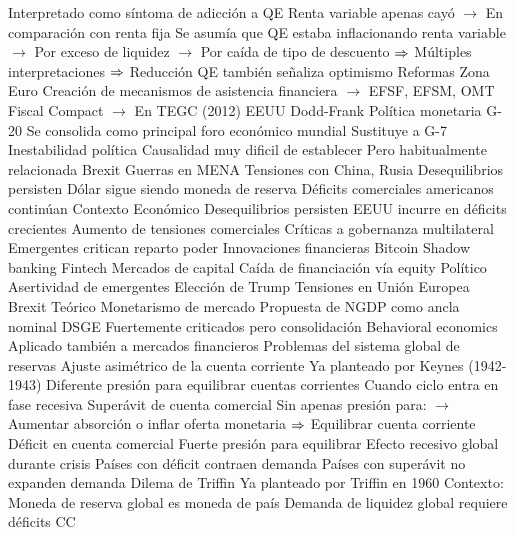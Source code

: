 \documentclass{nuevotema}
\begin{document}
\begin{esquemal}
				\4[] Interpretado como síntoma de adicción a QE
				\4[] Renta variable apenas cayó
				\4[] $\to$ En comparación con renta fija
				\4[] Se asumía que QE estaba inflacionando renta variable
				\4[] $\to$ Por exceso de liquidez
				\4[] $\to$ Por caída de tipo de descuento
				\4[] $\then$ Múltiples interpretaciones
				\4[] $\then$ Reducción QE también señaliza optimismo
			\3 Reformas
				\4 Zona Euro
				\4[] Creación de mecanismos de asistencia financiera
				\4[] $\to$ EFSF, EFSM, OMT
				\4[] Fiscal Compact
				\4[] $\to$ En TEGC (2012)
				\4 EEUU
				\4[] Dodd-Frank
				\4[] Política monetaria
				\4 G-20
				\4[] Se consolida como principal foro económico mundial
				\4[] Sustituye a G-7
			\3 Inestabilidad política
				\4 Causalidad muy dificil de establecer
				\4[] Pero habitualmente relacionada
				\4 Brexit
				\4 Guerras en MENA
				\4 Tensiones con China, Rusia
			\3 Desequilibrios persisten
				\4 Dólar sigue siendo moneda de reserva
				\4 Déficits comerciales americanos continúan
	\1 
		\2 Contexto
			\3 Económico
				\4 Desequilibrios persisten
				\4 EEUU incurre en déficits crecientes
				\4 Aumento de tensiones comerciales
				\4 Críticas a gobernanza multilateral
				\4[] Emergentes critican reparto poder
				\4 Innovaciones financieras
				\4[] Bitcoin
				\4[] Shadow banking
				\4[] Fintech
				\4 Mercados de capital
				\4[] Caída de financiación vía equity
			\3 Político
				\4 Asertividad de emergentes
				\4 Elección de Trump
				\4 Tensiones en Unión Europea
				\4 Brexit
			\3 Teórico
				\4 Monetarismo de mercado
				\4[] Propuesta de NGDP como ancla nominal
				\4 DSGE
				\4[] Fuertemente criticados pero consolidación
				\4 Behavioral economics
				\4[] Aplicado también a mercados financieros
		\2 Problemas del sistema global de reservas
			\3 Ajuste asimétrico de la cuenta corriente
				\4 Ya planteado por Keynes (1942-1943)
				\4 Diferente presión para equilibrar cuentas corrientes
				\4[] Cuando ciclo entra en fase recesiva
				\4 Superávit de cuenta comercial
				\4[] Sin apenas presión para:
				\4[] $\to$ Aumentar absorción o inflar oferta monetaria
				\4[] $\then$ Equilibrar cuenta corriente
				\4 Déficit en cuenta comercial
				\4[] Fuerte presión para equilibrar
				\4[$\then$] Efecto recesivo global durante crisis
				\4[] Países con déficit contraen demanda
				\4[] Países con superávit no expanden demanda
			\3 Dilema de Triffin
				\4 Ya planteado por Triffin en 1960
				\4 Contexto:
				\4[] Moneda de reserva global es moneda de país
				\4 Demanda de liquidez global requiere déficits CC

\end{esquemal}
\end{document}
